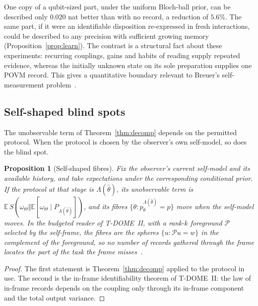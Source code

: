 \documentclass[12pt]{article}
\newtheorem{proposition}[theorem]{Proposition}
\theoremstyle{definition}
\theoremstyle{remark}
\newcommand{\E}{\mathbb E}
\begin{document}
One copy of a qubit-sized part, under the uniform Bloch-ball prior, can be described only $0.020$ nat better than with no record, a reduction of $5.6\%$. The same part, if it were an identifiable disposition re-expressed in fresh interactions, could be described to any precision with sufficient growing memory (Proposition~\ref{prop:learn}). The contrast is a structural fact about these experiments: recurring couplings, gains and habits of reading supply repeated evidence, whereas the initially unknown state on its sole preparation supplies one POVM record. This gives a quantitative boundary relevant to Breuer's self-measurement problem~\cite{Breuer1995}.

\subsection{Self-shaped blind spots}

The unobservable term of Theorem~\ref{thm:decomp} depends on the permitted protocol. When the protocol is chosen by the observer's own self-model, so does the blind spot.

\begin{proposition}[Self-shaped fibres]\label{prop:selfshaped}
Fix the observer's current self-model and its available history, and take expectations under the corresponding conditional prior. If the protocol at that stage is $\Lambda(\hat\theta)$, its unobservable term is $\E\,S(\omega_\Theta\Vert\E[\omega_\Theta\mid P_{\Lambda(\hat\theta)}])$, and its fibres $\{\theta:p^{\Lambda(\hat\theta)}_\theta=p\}$ move when the self-model moves. In the budgeted reader of T-DOME~II, with a rank-$k$ foreground $\mathcal P$ selected by the self-frame, the fibres are the spheres $\{u:\mathcal Pu=w\}$ in the complement of the foreground, so no number of records gathered through the frame locates the part of the task the frame misses~\cite{TDOMEII}.
\end{proposition}

\begin{proof}
The first statement is Theorem~\ref{thm:decomp} applied to the protocol in use. The second is the in-frame identifiability theorem of T-DOME~II: the law of in-frame records depends on the coupling only through its in-frame component and the total output variance.
\end{proof}
\end{document}
